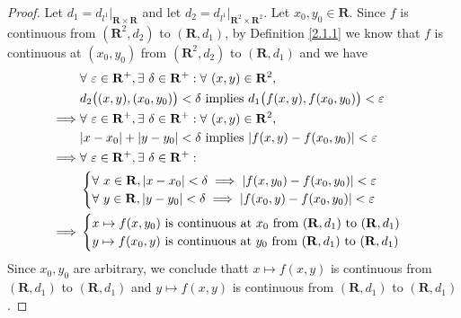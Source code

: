 \begin{proof}
    Let \(d_1 = d_{l^1}|_{\mathbf{R} \times \mathbf{R}}\) and let \(d_2 = d_{l^1}|_{\mathbf{R}^2 \times \mathbf{R}^2}\).
    Let \(x_0, y_0 \in \mathbf{R}\).
    Since \(f\) is continuous from \((\mathbf{R}^2, d_2)\) to \((\mathbf{R}, d_1)\), by Definition \ref{2.1.1} we know that \(f\) is continuous at \((x_0, y_0)\) from \((\mathbf{R}^2, d_2)\) to \((\mathbf{R}, d_1)\) and we have
    \begin{align*}
                 & \forall\ \varepsilon \in \mathbf{R}^+, \exists\ \delta \in \mathbf{R}^+ : \forall\ (x, y) \in \mathbf{R}^2, \\
                 & d_2\big((x, y), (x_0, y_0)\big) < \delta \text{ implies } d_1\big(f(x, y), f(x_0, y_0)\big) < \varepsilon   \\
        \implies & \forall\ \varepsilon \in \mathbf{R}^+, \exists\ \delta \in \mathbf{R}^+ : \forall\ (x, y) \in \mathbf{R}^2, \\
                 & \abs*{x - x_0} + \abs*{y - y_0} < \delta \text{ implies } \abs*{f(x, y) - f(x_0, y_0)} < \varepsilon        \\
        \implies & \forall\ \varepsilon \in \mathbf{R}^+, \exists\ \delta \in \mathbf{R}^+ :                                   \\
                 & \begin{cases}
            \forall\ x \in \mathbf{R}, \abs*{x - x_0} < \delta \implies \abs*{f(x, y_0) - f(x_0, y_0)} < \varepsilon \\
            \forall\ y \in \mathbf{R}, \abs*{y - y_0} < \delta \implies \abs*{f(x_0, y) - f(x_0, y_0)} < \varepsilon
        \end{cases}                                                                                  \\
        \implies & \begin{cases}
            x \mapsto f(x, y_0) \text{ is continuous at } x_0 \text{ from } (\mathbf{R}, d_1) \text{ to } (\mathbf{R}, d_1) \\
            y \mapsto f(x_0, y) \text{ is continuous at } y_0 \text{ from } (\mathbf{R}, d_1) \text{ to } (\mathbf{R}, d_1)
        \end{cases}
    \end{align*}
    Since \(x_0, y_0\) are arbitrary, we conclude thatt \(x \mapsto f(x, y)\) is continuous from \((\mathbf{R}, d_1)\) to \((\mathbf{R}, d_1)\) and \(y \mapsto f(x, y)\) is continuous from \((\mathbf{R}, d_1)\) to \((\mathbf{R}, d_1)\).
\end{proof}

